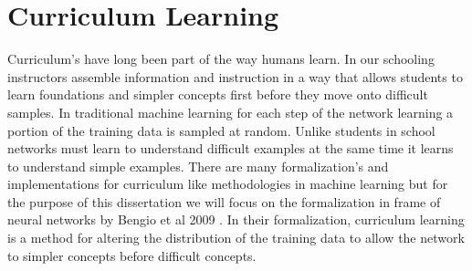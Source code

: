 \section{Curriculum Learning}
Curriculum's have long been part of the way humans learn. In our schooling instructors assemble information and instruction in a way that allows students to learn foundations and simpler concepts first before they move onto difficult samples. In traditional machine learning for each step of the network learning a portion of the training data is sampled at random. Unlike students in school networks must learn to understand difficult examples at the same time it learns to understand simple examples. There are many formalization's and implementations for curriculum like methodologies in machine learning but for the purpose of this dissertation we will focus on the formalization in frame of neural networks by Bengio et al 2009 \cite{Bengio2009CurriculumL}. In their formalization, curriculum learning is a method for altering the distribution of the training data to allow the network to simpler concepts before difficult concepts.
